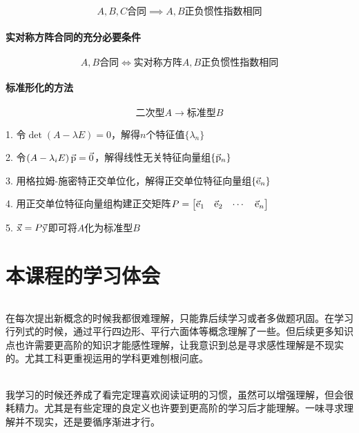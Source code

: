 \documentclass{article}
\begin{document}
\begin{theorem}[合同方阵惯性指数相同]
    \[A,B,C\text{合同}\implies A,B\text{正负惯性指数相同}\]
\end{theorem}

\subsection{实对称方阵合同的充分必要条件}

\begin{theorem}
    \[A,B\text{合同}\iff\text{实对称方阵}A,B\text{正负惯性指数相同}\]
\end{theorem}

\subsection{标准形化的方法}

\begin{theorem}[正交变换法]
    \[\text{二次型}A\to\text{标准型}B\]

    1. 令$\det\left(A-\lambda E\right)=0$，解得$n$个特征值$\{\lambda_n\}$

    2. 令$\left(A-\lambda_iE\right)\vec{\rm p}=\vec 0$，解得线性无关特征向量组$\{\vec{\rm p}_n\}$

    3. 用格拉姆-施密特正交单位化，解得正交单位特征向量组$\{\vec{\rm e}_n\}$

    4. 用正交单位特征向量组构建正交矩阵$\def \e {\vec{\rm e}}
        P=\begin{bmatrix}\e_1&\e_2&\cdots&\e_n\end{bmatrix}$

    5. $\vec{\rm x}=P\vec{\rm y}$即可将$A$化为标准型$B$
\end{theorem}

\newpage
\part{本课程的学习体会}

\paragraph{}
在每次提出新概念的时候我都很难理解，只能靠后续学习或者多做题巩固。在学习行列式的时候，通过平行四边形、平行六面体等概念理解了一些。但后续更多知识点也许需要更高阶的知识才能感性理解，让我意识到总是寻求感性理解是不现实的。尤其工科更重视运用的学科更难刨根问底。

\paragraph{}
我学习的时候还养成了看完定理喜欢阅读证明的习惯，虽然可以增强理解，但会很耗精力。尤其是有些定理的良定义也许要到更高阶的学习后才能理解。一味寻求理解并不现实，还是要循序渐进才行。
\end{document}
